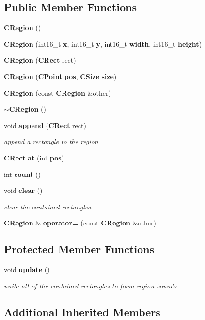 \subsection*{Public Member Functions}
\begin{DoxyCompactItemize}
\item 
{\bf C\-Region} ()
\item 
{\bf C\-Region} (int16\-\_\-t {\bf x}, int16\-\_\-t {\bf y}, int16\-\_\-t {\bf width}, int16\-\_\-t {\bf height})
\item 
{\bf C\-Region} ({\bf C\-Rect} rect)
\item 
{\bf C\-Region} ({\bf C\-Point} {\bf pos}, {\bf C\-Size} {\bf size})
\item 
{\bf C\-Region} (const {\bf C\-Region} \&other)
\item 
{\bf $\sim$\-C\-Region} ()
\item 
void {\bf append} ({\bf C\-Rect} rect)
\begin{DoxyCompactList}\small\item\em append a rectangle to the region \end{DoxyCompactList}\item 
{\bf C\-Rect} {\bf at} (int {\bf pos})
\item 
int {\bf count} ()
\item 
void {\bf clear} ()
\begin{DoxyCompactList}\small\item\em clear the contained rectangles. \end{DoxyCompactList}\item 
{\bf C\-Region} \& {\bf operator=} (const {\bf C\-Region} \&other)
\end{DoxyCompactItemize}
\subsection*{Protected Member Functions}
\begin{DoxyCompactItemize}
\item 
void {\bf update} ()
\begin{DoxyCompactList}\small\item\em unite all of the contained rectangles to form region bounds. \end{DoxyCompactList}\end{DoxyCompactItemize}
\subsection*{Additional Inherited Members}


